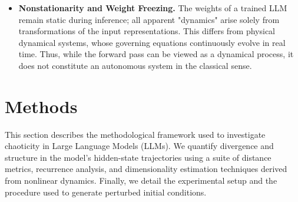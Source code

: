 \documentclass[a4paper,12pt]{article}
\begin{document}
\begin{itemize}
    \item \textbf{Nonstationarity and Weight Freezing.}  
    The weights of a trained LLM remain static during inference; all apparent "dynamics" arise solely from transformations of the input representations. This differs from physical dynamical systems, whose governing equations continuously evolve in real time. Thus, while the forward pass can be viewed as a dynamical process, it does not constitute an autonomous system in the classical sense.

\end{itemize}





\section{Methods}
\label{sec:methods}

This section describes the methodological framework used to investigate chaoticity in Large Language Models (LLMs). We quantify divergence and structure in the model’s hidden-state trajectories using a suite of distance metrics, recurrence analysis, and dimensionality estimation techniques derived from nonlinear dynamics. Finally, we detail the experimental setup and the procedure used to generate perturbed initial conditions.
\end{document}
